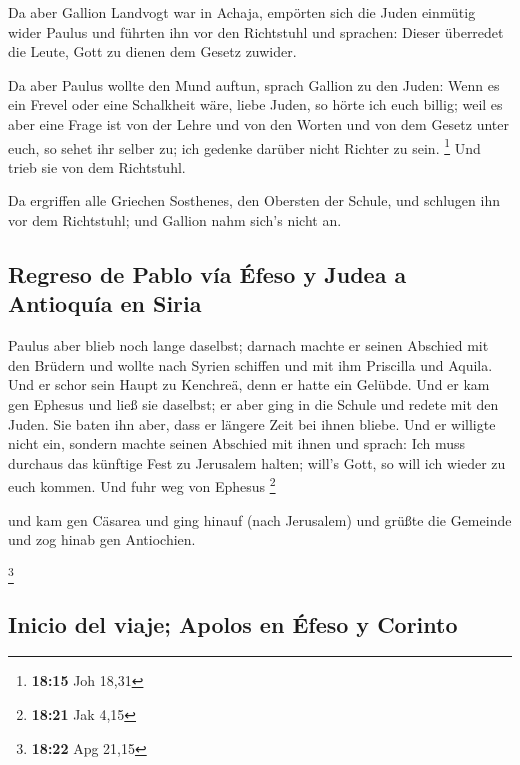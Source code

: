 Da aber Gallion Landvogt war in Achaja, empörten sich
die Juden einmütig wider Paulus und führten ihn vor den Richtstuhl
 und sprachen: Dieser überredet die Leute, Gott zu dienen
dem Gesetz zuwider.

 Da aber Paulus wollte den Mund auftun, sprach Gallion zu
den Juden: Wenn es ein Frevel oder eine Schalkheit wäre, liebe Juden, so
hörte ich euch billig;  weil es aber eine Frage ist von
der Lehre und von den Worten und von dem Gesetz unter euch, so sehet ihr
selber zu; ich gedenke darüber nicht Richter zu sein. \footnote{\textbf{18:15}
  Joh 18,31}  Und trieb sie von dem Richtstuhl.

 Da ergriffen alle Griechen Sosthenes, den Obersten der
Schule, und schlugen ihn vor dem Richtstuhl; und Gallion nahm sich's
nicht an.

\hypertarget{regreso-de-pablo-vuxeda-uxe9feso-y-judea-a-antioquuxeda-en-siria}{%
\subsection{Regreso de Pablo vía Éfeso y Judea a Antioquía en
Siria}\label{regreso-de-pablo-vuxeda-uxe9feso-y-judea-a-antioquuxeda-en-siria}}

 Paulus aber blieb noch lange daselbst; darnach machte er
seinen Abschied mit den Brüdern und wollte nach Syrien schiffen und mit
ihm Priscilla und Aquila. Und er schor sein Haupt zu Kenchreä, denn er
hatte ein Gelübde.  Und er kam gen Ephesus und ließ sie
daselbst; er aber ging in die Schule und redete mit den Juden.
 Sie baten ihn aber, dass er längere Zeit bei ihnen
bliebe. Und er willigte nicht ein,  sondern machte seinen
Abschied mit ihnen und sprach: Ich muss durchaus das künftige Fest zu
Jerusalem halten; will's Gott, so will ich wieder zu euch kommen. Und
fuhr weg von Ephesus \footnote{\textbf{18:21} Jak 4,15}

 und kam gen Cäsarea und ging hinauf (nach Jerusalem) und
grüßte die Gemeinde und zog hinab gen Antiochien.

\footnote{\textbf{18:22} Apg 21,15}

\hypertarget{inicio-del-viaje-apolos-en-uxe9feso-y-corinto}{%
\subsection{Inicio del viaje; Apolos en Éfeso y
Corinto}\label{inicio-del-viaje-apolos-en-uxe9feso-y-corinto}}

